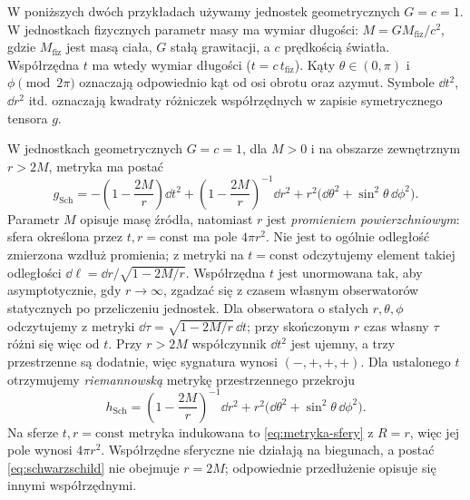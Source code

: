 W poniższych dwóch przykładach używamy jednostek
geometrycznych $G=c=1$. W jednostkach fizycznych
parametr masy ma wymiar długości:
$M=G M_{\mathrm{fiz}}/c^2$, gdzie
$M_{\mathrm{fiz}}$ jest masą ciała, $G$ stałą
grawitacji, a $c$ prędkością światła. Współrzędna
$t$ ma wtedy wymiar długości ($t=c\,t_{\mathrm{fiz}}$).
Kąty $\theta\in(0,\pi)$ i $\phi\pmod{2\pi}$
oznaczają odpowiednio kąt od osi obrotu oraz azymut.
Symbole $\dd t^2$, $\dd r^2$ itd. oznaczają
kwadraty różniczek współrzędnych w zapisie
symetrycznego tensora $g$.

\begin{przyklad}[Schwarzschild]
\label{prz:metryka-schwarzschild}
W jednostkach geometrycznych $G=c=1$, dla $M>0$
i na obszarze zewnętrznym $r>2M$, metryka ma postać
\begin{equation}\label{eq:schwarzschild}
 g_{\mathrm{Sch}}
 =-\left(1-\frac{2M}{r}\right)\dd t^2
  +\left(1-\frac{2M}{r}\right)^{-1}\dd r^2
  +r^2\bigl(\dd\theta^2+\sin^2\theta\,\dd\phi^2\bigr).
\end{equation}
Parametr $M$ opisuje masę źródła, natomiast $r$
jest \emph{promieniem powierzchniowym}:
sfera określona przez $t,r=\mathrm{const}$
ma pole $4\pi r^2$. Nie jest to ogólnie odległość
zmierzona wzdłuż promienia; z metryki na
$t=\mathrm{const}$ odczytujemy element takiej
odległości $\dd\ell=\dd r/\sqrt{1-2M/r}$.
Współrzędna $t$ jest unormowana tak, aby asymptotycznie, gdy
$r\to\infty$, zgadzać się z czasem własnym obserwatorów
statycznych po przeliczeniu jednostek. Dla obserwatora
o stałych $r,\theta,\phi$ odczytujemy z metryki
$\dd\tau=\sqrt{1-2M/r}\,\dd t$; przy skończonym $r$
czas własny $\tau$ różni się więc od $t$.
Przy $r>2M$ współczynnik $\dd t^2$ jest ujemny,
a trzy przestrzenne są dodatnie, więc sygnatura
wynosi $(-,+,+,+)$. Dla ustalonego $t$
otrzymujemy \emph{riemannowską} metrykę przestrzennego
przekroju
\[
 h_{\mathrm{Sch}}
 =\left(1-\frac{2M}{r}\right)^{-1}\dd r^2
  +r^2\bigl(\dd\theta^2+\sin^2\theta\,\dd\phi^2\bigr).
\]
Na sferze $t,r=\mathrm{const}$ metryka indukowana
to \eqref{eq:metryka-sfery} z $R=r$, więc jej
pole wynosi $4\pi r^2$. Współrzędne sferyczne
nie działają na biegunach, a postać
\eqref{eq:schwarzschild} nie obejmuje $r=2M$;
odpowiednie przedłużenie opisuje się innymi
współrzędnymi.
\end{przyklad}


